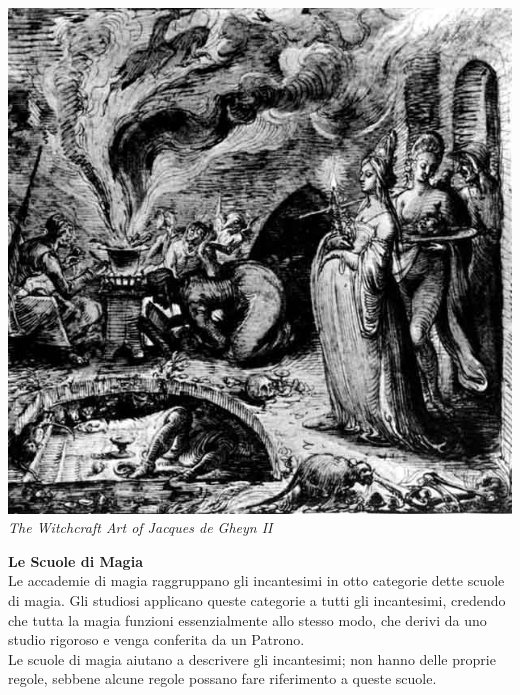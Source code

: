 \begin{multicols}{2}
\begin{center}
	\includegraphics[width=0.9\linewidth]{immagini/infanticidalwitch.jpg}
	\textit{The Witchcraft Art of Jacques de Gheyn II}
\end{center}

\medskip

\textbf{Le Scuole di Magia}\\
Le accademie di magia raggruppano gli incantesimi in otto categorie dette scuole di magia. Gli studiosi applicano queste categorie a tutti gli incantesimi, credendo che tutta la magia funzioni essenzialmente allo stesso modo, che derivi da uno studio rigoroso e venga conferita da un Patrono.\\
Le scuole di magia aiutano a descrivere gli incantesimi; non hanno delle proprie regole, sebbene alcune regole possano fare riferimento a queste scuole.\\


\end{multicols}
